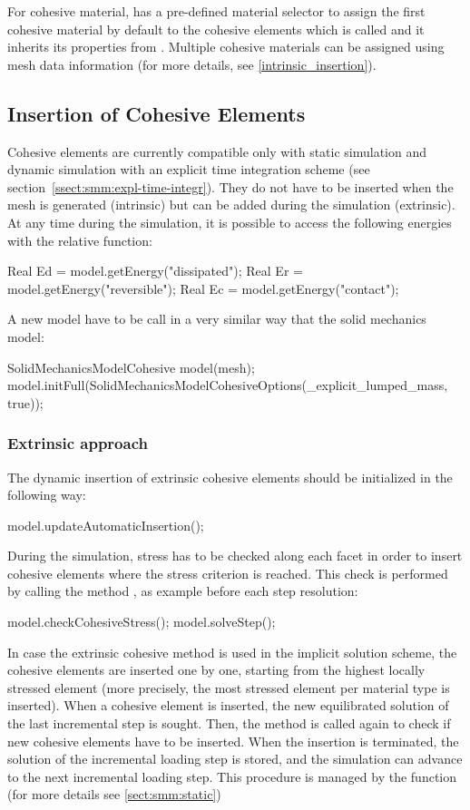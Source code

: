 For cohesive material, \akantu has a pre-defined material selector to
assign the first cohesive material by default to the cohesive elements
which is called
 and it inherits its properties from 
. Multiple cohesive materials can be assigned 
using mesh data information (for more details,
see \ref{intrinsic_insertion}).

\subsection{Insertion of Cohesive Elements}
Cohesive elements are currently compatible only with static simulation
and dynamic simulation with an explicit time integration scheme (see
section~\ref{ssect:smm:expl-time-integr}). They do not have to be
inserted when the mesh is generated (intrinsic) but can be added
during the simulation (extrinsic). At any time during the simulation,
it is possible to access the following energies with the relative
function:
\begin{cpp}
  Real Ed = model.getEnergy("dissipated");
  Real Er = model.getEnergy("reversible");
  Real Ec = model.getEnergy("contact");
\end{cpp}

A new model have to be call in a very similar way that the solid
mechanics model:
\begin{cpp}
  SolidMechanicsModelCohesive model(mesh);
  model.initFull(SolidMechanicsModelCohesiveOptions(_explicit_lumped_mass, true));
\end{cpp} 


\subsubsection{Extrinsic approach \label{extrinsic_insertion}}
The dynamic insertion of extrinsic cohesive elements should be initialized 
in the following way:
\begin{cpp}
  model.updateAutomaticInsertion();
\end{cpp}
During the simulation, stress has to be checked along each facet in
order to insert cohesive elements where the stress criterion is
reached.  This check is performed by calling the
method , as example before each step
resolution:
\begin{cpp}
  model.checkCohesiveStress();
  model.solveStep();
\end{cpp}

In case the extrinsic cohesive method is used in the implicit solution
scheme, the cohesive elements are inserted one by one, starting from
the highest locally stressed element (more precisely, the most
stressed element per material type is inserted).  When a cohesive
element is inserted, the new equilibrated solution of the last
incremental step is sought. Then, the
method  is called again to check if new
cohesive elements have to be inserted.  When the insertion is
terminated, the solution of the incremental loading step is stored,
and the simulation can advance to the next incremental loading step.
This procedure is managed by the function 
(for more details see \ref{sect:smm:static})

